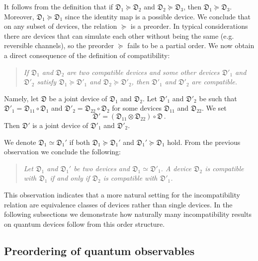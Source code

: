 \documentclass[12pt]{iopart}
\theoremstyle{definition}
\newcommand{\Dev}{\mathfrak{D}} %
\newcommand{\pgeq}{\succeq}
\begin{document}
{It follows from the definition that if $\Dev_1 \pgeq \Dev_2$ and $\Dev_2 \pgeq \Dev_3$, then $\Dev_1 \pgeq \Dev_3$.
Moreover, $\Dev_1 \pgeq \Dev_1$ since the identity map is a possible device. 
We conclude that on any subset of devices, the relation $\pgeq$ is a preorder.
In typical considerations there are devices that can simulate each other without being the same (e.g. reversible channels), so the preorder $\pgeq$ fails to be a partial order.
We now obtain a direct consequence of the definition of compatibility:
\begin{quote}
\emph{If $\Dev_1$ and $\Dev_2$ are two compatible devices and some other devices $\Dev'_1$ and $\Dev'_2$ satisfy
$\Dev_1 \pgeq \Dev'_1$ and $\Dev_2
\pgeq \Dev'_2$, then $\Dev'_1$ and $\Dev'_2$  are compatible.}
\end{quote}
Namely, let $\Dev$ be a joint device of $\Dev_1$ and $\Dev_2$.
Let $\Dev'_1$ and $\Dev'_2$ be such that
$\Dev'_1 = \Dev_{11} \circ \Dev_1$ and $\Dev'_2 = \Dev_{22} \circ \Dev_2$ for some devices $\Dev_{11}$ and $\Dev_{22}$.
We set
\begin{equation}
\Dev' = (\Dev_{11} \otimes \Dev_{22}) \circ \Dev \, . 
\end{equation}
Then $\Dev'$ is a joint device of $\Dev'_1$ and $\Dev'_2$.


We denote $\Dev_1\simeq \Dev_1'$ if both $\Dev_1 \pgeq \Dev_1'$ and $\Dev_1'\pgeq \Dev_1$ hold. 
From the previous observation we conclude the following:
\begin{quote}
\emph{Let $\Dev_1$ and $\Dev_1'$ be two devices and $\Dev_1 \simeq \Dev'_1$.
A device $\Dev_2$ is compatible with $\Dev_1$ if and only if $\Dev_2$ is compatible with $\Dev'_1$.}
\end{quote}
This observation indicates that a more natural setting for the incompatibility relation are equivalence classes of devices rather than single devices.
In the following subsections we demonstrate how naturally many incompatibility results on quantum devices follow from this order structure.

\subsection{Preordering of quantum observables}

}
\end{document}
